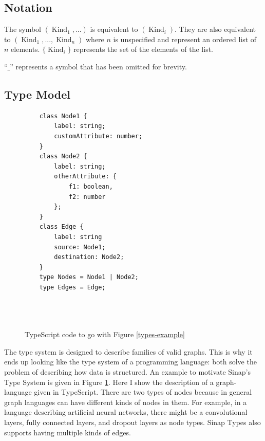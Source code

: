 \documentclass[12pt]{article}
\begin{document}
\subsection{Notation}

The symbol \((\operatorname{Kind}_1, ...)\) is equivalent to 
\((\operatorname{Kind}_i)\). They are also equivalent to 
\((\operatorname{Kind}_1, ..., \operatorname{Kind}_n)\)
where \(n\) is unspecified and represent an ordered list 
of \(n\) elements. \(\{\operatorname{Kind}_i\}\) represents 
the set of the elements of the list. 

``\(\_\)'' represents a symbol that has been omitted for brevity.

\subsection{Type Model}
\begin{figure}
    \begin{mdframed}    
    \begin{multicols}{2}
    
    \begin{verbatim}
    class Node1 {
        label: string;
        customAttribute: number;
    }
    class Node2 {
        label: string;
        otherAttribute: {
            f1: boolean,
            f2: number
        };
    }
    class Edge {
        label: string
        source: Node1;
        destination: Node2;
    }
    type Nodes = Node1 | Node2;
    type Edges = Edge;

    
    
    \end{verbatim}
    \end{multicols}
    \end{mdframed}
    \caption{TypeScript code to go with Figure \ref{types-example}}
    \label{types-example-code}
\end{figure}    

The type system is designed to describe families of valid graphs. 
This is why it ends up looking like the type system of a programming 
language: both solve the problem of describing how data is structured.
An example to motivate Sinap's Type System is given in Figure 
\ref{types-example-code}. Here I show the description of a graph-language
given in TypeScript. There are two types of nodes because 
in general graph languages can have different kinds of nodes in them. 
For example, in a language describing artificial neural networks, 
there might be a convolutional layers, fully connected layers, and 
dropout layers as node types. Sinap Types also supports having multiple
kinds of edges. 
\end{document}
